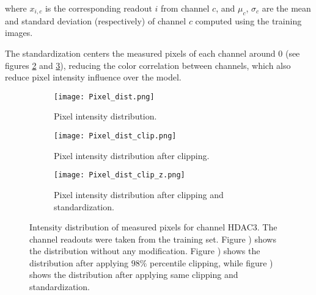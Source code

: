 \noindent where $x_{i,c}$ is the corresponding readout $i$ from channel $c$, and $\mu_c$, $\sigma_c$ are the mean and standard deviation (respectively) of channel $c$ computed using the training images.

The standardization centers the measured pixels of each channel around 0 (see figures \ref{fig:data_pp:pixel_dist:clip} and \ref{fig:data_pp:pixel_dist:clip_z}), reducing the color correlation between channels, which also reduce pixel intensity influence over the model.

\begin{figure}[htb]
  \centering
  \begin{subfigure}[t]{.29\linewidth}
    \texttt{[image: Pixel\_dist.png]}
    \caption{Pixel intensity distribution.}
    \label{fig:data_pp:pixel_dist:ori}
  \end{subfigure}
  \hspace{4mm}
  \begin{subfigure}[t]{.3\linewidth}
    \texttt{[image: Pixel\_dist\_clip.png]}
    \caption{Pixel intensity distribution after clipping.}
    \label{fig:data_pp:pixel_dist:clip}
  \end{subfigure}
  \hspace{4mm}
  \begin{subfigure}[t]{.28\linewidth}
    \texttt{[image: Pixel\_dist\_clip\_z.png]}
    \caption{Pixel intensity distribution after clipping and standardization.}
    \label{fig:data_pp:pixel_dist:clip_z}
  \end{subfigure}
  \caption{Intensity distribution of measured pixels for channel HDAC3. The channel readouts were taken from the training set. Figure ) shows the distribution without any modification. Figure ) shows the distribution after applying $98\%$ percentile clipping, while figure ) shows the distribution after applying same clipping and standardization.}
  \label{fig:data_pp:pixel_dist}
\end{figure}
